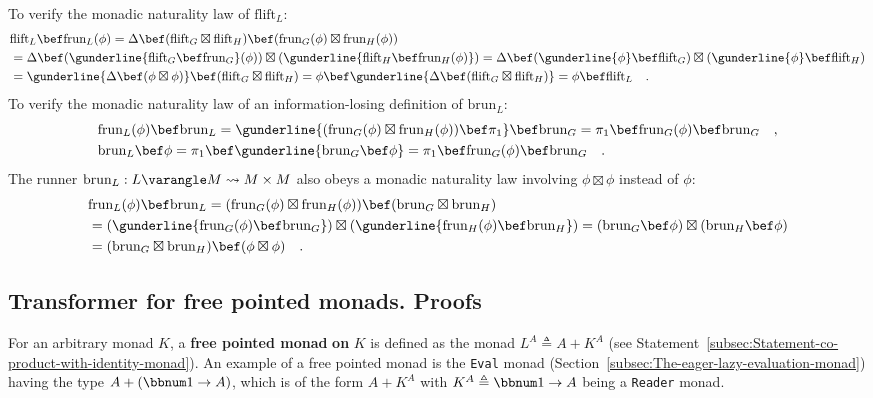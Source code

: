 To verify the monadic naturality law of $\text{flift}_{L}$:
\begin{align*}
 & \text{flift}_{L}\bef\text{frun}_{L}(\phi)=\Delta\bef(\text{flift}_{G}\boxtimes\text{flift}_{H})\bef(\text{frun}_{G}(\phi)\boxtimes\text{frun}_{H}(\phi))\\
 & =\Delta\bef(\gunderline{\text{flift}_{G}\bef\text{frun}_{G}}(\phi))\boxtimes(\gunderline{\text{flift}_{H}\bef\text{frun}_{H}(\phi)})=\Delta\bef(\gunderline{\phi}\bef\text{flift}_{G})\boxtimes(\gunderline{\phi}\bef\text{flift}_{H})\\
 & =\gunderline{\Delta\bef(\phi\boxtimes\phi)}\bef(\text{flift}_{G}\boxtimes\text{flift}_{H})=\phi\bef\gunderline{\Delta\bef(\text{flift}_{G}\boxtimes\text{flift}_{H})}=\phi\bef\text{flift}_{L}\quad.
\end{align*}
To verify the monadic naturality law of an information-losing definition
of $\text{brun}_{L}$:
\begin{align*}
 & \text{frun}_{L}(\phi)\bef\text{brun}_{L}=\gunderline{(\text{frun}_{G}(\phi)\boxtimes\text{frun}_{H}(\phi))\bef\pi_{1}}\bef\text{brun}_{G}=\pi_{1}\bef\text{frun}_{G}(\phi)\bef\text{brun}_{G}\quad,\\
 & \text{brun}_{L}\bef\phi=\pi_{1}\bef\gunderline{\text{brun}_{G}\bef\phi}=\pi_{1}\bef\text{frun}_{G}(\phi)\bef\text{brun}_{G}\quad.
\end{align*}
The runner $\text{brun}_{L}:L\varangle M\leadsto M\times M$ also
obeys a monadic naturality law involving $\phi\boxtimes\phi$ instead
of $\phi$:
\begin{align*}
 & \text{frun}_{L}(\phi)\bef\text{brun}_{L}=(\text{frun}_{G}(\phi)\boxtimes\text{frun}_{H}(\phi))\bef(\text{brun}_{G}\boxtimes\text{brun}_{H})\\
 & =(\gunderline{\text{frun}_{G}(\phi)\bef\text{brun}_{G}})\boxtimes(\gunderline{\text{frun}_{H}(\phi)\bef\text{brun}_{H}})=(\text{brun}_{G}\bef\phi)\boxtimes(\text{brun}_{H}\bef\phi)\\
 & =(\text{brun}_{G}\boxtimes\text{brun}_{H})\bef(\phi\boxtimes\phi)\quad.
\end{align*}


\subsection{Transformer for free pointed monads. Proofs}

For an arbitrary monad $K$, a \textbf{free pointed monad} \textbf{on}
$K$ is defined as the monad $L^{A}\triangleq A+K^{A}$ (see Statement~\ref{subsec:Statement-co-product-with-identity-monad}).
An example of a free pointed monad is the \lstinline!Eval! monad
(Section~\ref{subsec:The-eager-lazy-evaluation-monad}) having the
type $A+(\bbnum 1\rightarrow A)$, which is of the form $A+K^{A}$
with $K^{A}\triangleq\bbnum 1\rightarrow A$ being a \lstinline!Reader!
monad. 

